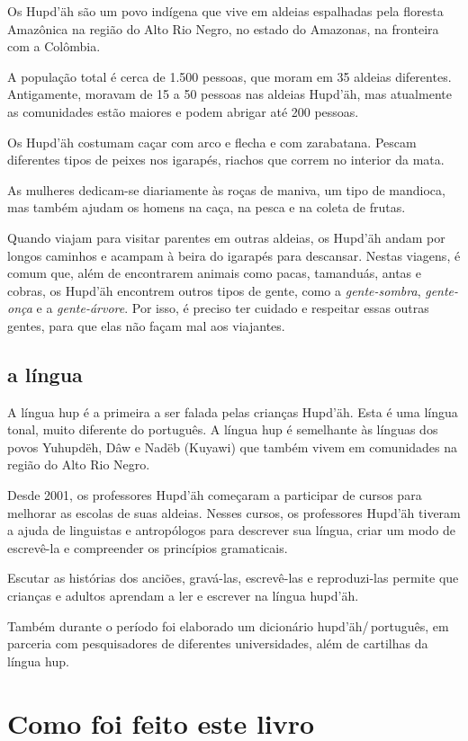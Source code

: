 Os Hupd’äh são um povo indígena que vive em aldeias espalhadas pela floresta Amazônica na região do Alto Rio Negro, no estado do Amazonas, na fronteira com a Colômbia.

A população total é cerca de 1.500 pessoas, que moram em 35 aldeias diferentes. Antigamente, moravam de 15 a 50 pessoas nas aldeias Hupd’äh, mas atualmente as comunidades estão maiores e podem abrigar até 200 pessoas.

Os Hupd’äh costumam caçar com arco e flecha e com zarabatana. Pescam diferentes tipos de peixes nos igarapés, riachos que correm no interior da mata.

As mulheres dedicam-se diariamente às roças de maniva, um tipo de mandioca, mas também ajudam os homens na caça, na pesca e na coleta de frutas.

Quando viajam para visitar parentes em outras aldeias, os Hupd’äh andam por longos caminhos e acampam à beira do igarapés para descansar. Nestas viagens, é comum que, além de encontrarem animais como pacas, tamanduás, antas e cobras, os Hupd’äh encontrem outros tipos de gente, como a \textit{gente-sombra}, \textit{gente-onça} e a \textit{gente-árvore}. Por isso, é preciso ter cuidado e respeitar essas outras gentes, para que elas não façam mal aos viajantes.

\section{a língua}

A língua hup é a primeira a ser falada pelas crianças Hupd’äh. Esta é uma língua tonal, muito
diferente do português. A língua hup é semelhante às línguas dos povos Yuhupdëh,
Dâw e Nadëb (Kuyawi) que também vivem em comunidades na região do Alto Rio Negro.

Desde 2001, os professores Hupd’äh começaram a participar de cursos para melhorar as
escolas de suas aldeias. Nesses cursos, os professores Hupd’äh tiveram a ajuda de linguistas e antropólogos para descrever sua língua, criar um modo de escrevê-la e compreender os princípios gramaticais.

Escutar as histórias dos anciões, gravá-las, escrevê-las e reproduzi-las permite que
crianças e adultos aprendam a ler e escrever na língua hupd’äh.

Também durante o período foi elaborado um dicionário hupd’äh/\,português, em parceria
com pesquisadores de diferentes universidades, além de cartilhas da língua hup.

\chapter{Como foi feito este livro}

